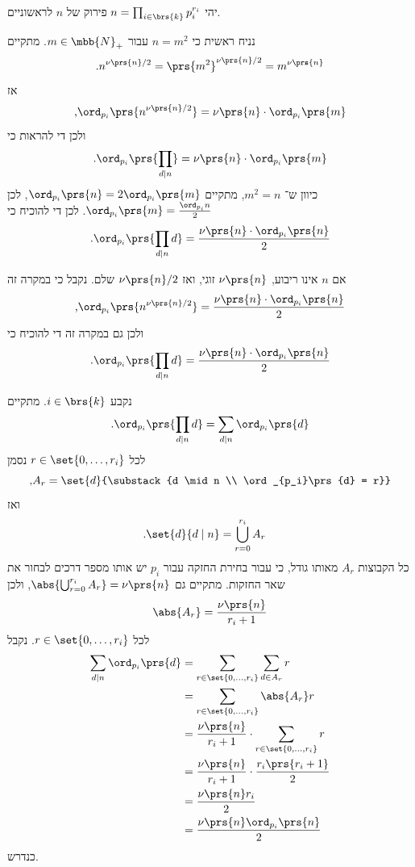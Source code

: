 \documentclass[a4paper,10pt,twoside,openany]{book}
\begin{document}
\begin{solution}
יהי
$n = \prod_{i \in \brs{k}} p_i^{r_i}$
פירוק של
$n$
לראשוניים.

נניח ראשית כי
$n = m^2$
עבור
$m \in \mbb{N}_+$.
מתקיים
\[\text{.} n^{\nu\prs{n} / 2} = \prs{m^2}^{\nu\prs{n} / 2} = m^{\nu\prs{n}}\]
אז
\[\text{,} \ord_{p_i} \prs{ n^{\nu\prs{n}/2} } = \nu\prs{n} \cdot \ord_{p_i}\prs{m}\]
ולכן די להראות כי
\[\text{.} \ord_{p_i} \prs{\prod_{d \mid n}} = \nu\prs{n} \cdot \ord_{p_i}\prs{m}\]
כיוון ש־%
$m^2 = n$,
מתקיים
$\ord_{p_i}\prs{n} = 2 \ord_{p_i}\prs{m}$,
לכן
$\ord_{p_i}\prs{m} = \frac{\ord_{p_i}{n}}{2}$.
לכן די להוכיח כי
\[\text{.} \ord_{p_i} \prs{\prod_{d \mid n} d} = \frac{\nu\prs{n} \cdot \ord_{p_i}\prs{n}}{2}\]

אם
$n$
אינו ריבוע,
$\nu\prs{n}$
זוגי, ואז
$\nu\prs{n} / 2$
שלם. נקבל כי במקרה זה
\[\text{,}\ord_{p_i}\prs{n^{\nu\prs{n} / 2}} = \frac{\nu\prs{n} \cdot \ord_{p_i}\prs{n}}{2}\]
ולכן גם במקרה זה די להוכיח כי
\[\text{.} \ord_{p_i} \prs{\prod_{d \mid n} d} = \frac{\nu\prs{n} \cdot \ord_{p_i}\prs{n}}{2}\]

נקבע
$i \in \brs{k}$.
מתקיים
\begin{align*}
\text{.} \ord_{p_i} \prs{\prod_{d \mid n} d} = \sum_{d \mid n} \ord_{p_i}\prs{d}
\end{align*}
לכל
$r \in \set{0, \ldots, r_i}$
נסמן
\[\text{,} A_r = \set{d}{\substack{d \mid n \\ \ord_{p_i}\prs{d} = r}}\]
ואז
\begin{align*}
\text{.} \set{d}{d \mid n} &= \bigcup_{r = 0}^{r_i} A_r 
\end{align*}
כל הקבוצות
$A_r$
מאותו גודל, כי עבור בחירת החזקה עבור
$p_i$
יש אותו מספר דרכים לבחור את שאר החזקות.
מתקיים גם
$\abs{\bigcup_{r = 0}^{r_i} A_r} = \nu\prs{n}$,
ולכן
\[\abs{A_r} = \frac{\nu\prs{n}}{r_i + 1}\]
לכל
$r \in \set{0, \ldots, r_i}$.
נקבל
\begin{align*}
\sum_{d \mid n} \ord_{p_i}\prs{d} &=
\sum_{r \in \set{0, \ldots, r_i}} \sum_{d \in A_r} r
\\&=
\sum_{r \in \set{0, \ldots, r_i}} \abs{A_r} r
\\&=
\frac{\nu\prs{n}}{r_i + 1} \cdot \sum_{r \in \set{0, \ldots, r_i}} r
\\&= \frac{\nu\prs{n}}{r_i + 1} \cdot \frac{r_i \prs{r_i+1}}{2}
\\&= \frac{\nu\prs{n} r_i}{2}
\\&= \frac{\nu\prs{n} \ord_{p_i}\prs{n}}{2}
\end{align*}
כנדרש.

\end{solution}
\end{document}
